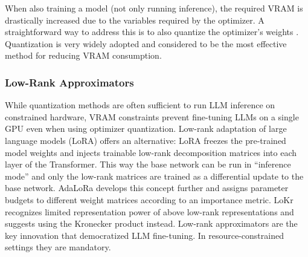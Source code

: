 \documentclass[conference]{IEEEtran}
\begin{document}
When also training a model (not only running inference), the required VRAM is drastically increased due to the variables required by the optimizer. A straightforward way to address this is to also quantize the optimizer's weights \cite{bnb_opt}.
Quantization is very widely adopted and considered to be the most effective method for reducing VRAM consumption.





\subsubsection{Low-Rank Approximators}\label{sec:lora}
While quantization methods are often sufficient to run LLM inference on constrained hardware, VRAM constraints prevent fine-tuning LLMs on a single GPU even when using optimizer quantization. Low-rank adaptation of large language models (LoRA) \cite{lora} offers an alternative: LoRA freezes the pre-trained model weights and injects trainable low-rank decomposition matrices into each layer of the Transformer. This way the base network can be run in ``inference mode'' and only the low-rank matrices are trained as a differential update to the base network. AdaLoRa \cite{adalora} develops this concept further and assigns parameter budgets to different weight matrices according to an importance metric. LoKr \cite{LoKr} recognizes limited representation power of above low-rank representations and suggests using the Kronecker product instead.
Low-rank approximators are the key innovation that democratized LLM fine-tuning. In resource-constrained settings they are mandatory.
\end{document}
